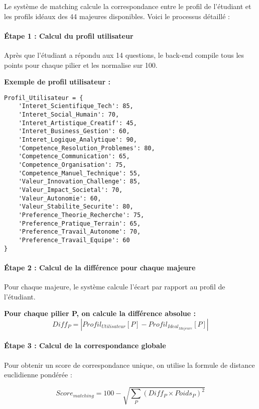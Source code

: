 \documentclass[12pt,a4paper]{report}
\begin{document}
Le système de matching calcule la correspondance entre le profil de l'étudiant et les profils idéaux des 44 majeures disponibles. Voici le processus détaillé :

\paragraph{Étape 1 : Calcul du profil utilisateur}
Après que l'étudiant a répondu aux 14 questions, le back-end compile tous les points pour chaque pilier et les normalise sur 100.

\textbf{Exemple de profil utilisateur :}
\begin{verbatim}
Profil_Utilisateur = {
    'Interet_Scientifique_Tech': 85,
    'Interet_Social_Humain': 70,
    'Interet_Artistique_Creatif': 45,
    'Interet_Business_Gestion': 60,
    'Interet_Logique_Analytique': 90,
    'Competence_Resolution_Problemes': 80,
    'Competence_Communication': 65,
    'Competence_Organisation': 75,
    'Competence_Manuel_Technique': 55,
    'Valeur_Innovation_Challenge': 85,
    'Valeur_Impact_Societal': 70,
    'Valeur_Autonomie': 60,
    'Valeur_Stabilite_Securite': 80,
    'Preference_Theorie_Recherche': 75,
    'Preference_Pratique_Terrain': 65,
    'Preference_Travail_Autonome': 70,
    'Preference_Travail_Equipe': 60
}
\end{verbatim}

\paragraph{Étape 2 : Calcul de la différence pour chaque majeure}
Pour chaque majeure, le système calcule l'écart par rapport au profil de l'étudiant.

\textbf{Pour chaque pilier P, on calcule la différence absolue :}
\begin{equation}
Diff_P = |Profil_{Utilisateur}[P] - Profil_{Ideal_{Majeure}}[P]|
\end{equation}

\paragraph{Étape 3 : Calcul de la correspondance globale}
Pour obtenir un score de correspondance unique, on utilise la formule de distance euclidienne pondérée :

\begin{equation}
Score_{matching} = 100 - \sqrt{\sum_{P} (Diff_P \times Poids_P)^2}
\end{equation}
\end{document}
